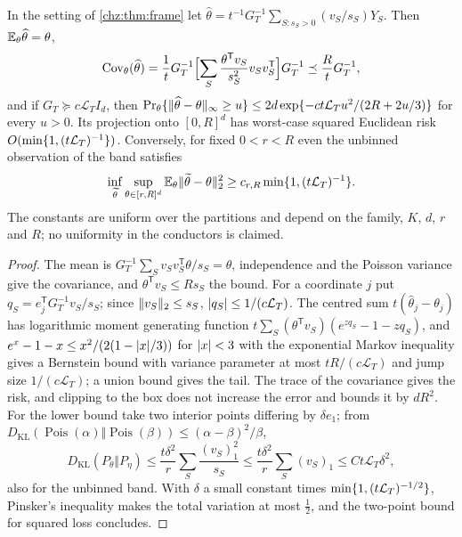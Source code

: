 \begin{theorem}\label{chz:thm:mixest}
In the setting of \cref{chz:thm:frame} let $\widehat\theta=t^{-1}G_T^{-1}\sum_{S:s_S>0}(v_S/s_S)Y_S$. Then
$\mathbb{E}_\theta\widehat\theta=\theta$,
\[
 \operatorname{Cov}_\theta(\widehat\theta)=\frac1tG_T^{-1}\Bigl[\sum_S\frac{\theta^{\mathsf T}v_S}{s_S^2}v_Sv_S^{\mathsf T}\Bigr]G_T^{-1}\preceq\frac RtG_T^{-1},
\]
and if $G_T\succeq c\mathcal L_TI_d$, then
$\Pr_\theta\{\lVert\widehat\theta-\theta\rVert_\infty\ge u\}\le2d\exp\{-ct\mathcal L_Tu^2/(2R+2u/3)\}$ for every $u>0$. Its projection
onto $[0,R]^d$ has worst-case squared Euclidean risk $O(\min\{1,(t\mathcal L_T)^{-1}\})$. Conversely, for fixed $0<r<R$
even the unbinned observation of the band satisfies
\[
 \inf_{\widetilde\theta}\sup_{\theta\in[r,R]^d}\mathbb{E}_\theta\lVert\widetilde\theta-\theta\rVert_2^2\ge c_{r,R}\min\{1,(t\mathcal L_T)^{-1}\} .
\]
The constants are uniform over the partitions and depend on the family, $K$, $d$, $r$ and $R$; no uniformity in the
conductors is claimed.
\end{theorem}

\begin{proof}
The mean is $G_T^{-1}\sum_Sv_Sv_S^{\mathsf T}\theta/s_S=\theta$, independence and the Poisson variance give the covariance, and
$\theta^{\mathsf T}v_S\le Rs_S$ the bound. For a coordinate $j$ put $q_S=e_j^{\mathsf T}G_T^{-1}v_S/s_S$; since
$\lVert v_S\rVert_2\le s_S$, $\lvert q_S\rvert\le1/(c\mathcal L_T)$. The centred sum $t(\widehat\theta_j-\theta_j)$ has logarithmic moment generating
function $t\sum_S(\theta^{\mathsf T}v_S)(e^{zq_S}-1-zq_S)$, and $e^x-1-x\le x^2/(2(1-\lvert x\rvert/3))$ for $\lvert x\rvert<3$ with the exponential
Markov inequality gives a Bernstein bound with variance parameter at most $tR/(c\mathcal L_T)$ and jump size
$1/(c\mathcal L_T)$; a union bound gives the tail. The trace of the covariance gives the risk, and clipping to the box
does not increase the error and bounds it by $dR^2$. For the lower bound take two interior points differing by
$\delta e_1$; from $D_{\mathrm{KL}}(\operatorname{Pois}(\alpha)\Vert\operatorname{Pois}(\beta))\le(\alpha-\beta)^2/\beta$,
\[
 D_{\mathrm{KL}}(P_\theta\Vert P_\eta)\le\frac{t\delta^2}r\sum_S\frac{(v_S)_1^2}{s_S}\le\frac{t\delta^2}r\sum_S(v_S)_1\le Ct\mathcal L_T\delta^2,
\]
also for the unbinned band. With $\delta$ a small constant times $\min\{1,(t\mathcal L_T)^{-1/2}\}$, Pinsker's inequality makes the
total variation at most $\tfrac12$, and the two-point bound for squared loss concludes.
\end{proof}

